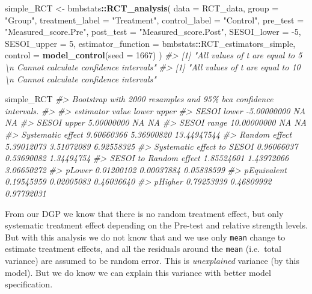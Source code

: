 \documentclass[
]{book}
\newenvironment{Shaded}{\begin{snugshade}}{\end{snugshade}}
\newcommand{\CommentTok}[1]{\textcolor[rgb]{0.56,0.35,0.01}{\textit{#1}}}
\newcommand{\DataTypeTok}[1]{\textcolor[rgb]{0.13,0.29,0.53}{#1}}
\newcommand{\DecValTok}[1]{\textcolor[rgb]{0.00,0.00,0.81}{#1}}
\newcommand{\KeywordTok}[1]{\textcolor[rgb]{0.13,0.29,0.53}{\textbf{#1}}}
\newcommand{\NormalTok}[1]{#1}
\newcommand{\OperatorTok}[1]{\textcolor[rgb]{0.81,0.36,0.00}{\textbf{#1}}}
\newcommand{\StringTok}[1]{\textcolor[rgb]{0.31,0.60,0.02}{#1}}
\begin{document}
\begin{Shaded}
\begin{Highlighting}[]
\NormalTok{simple\_RCT <{-}}\StringTok{ }\NormalTok{bmbstats}\OperatorTok{::}\KeywordTok{RCT\_analysis}\NormalTok{(}
  \DataTypeTok{data =}\NormalTok{ RCT\_data,}
  \DataTypeTok{group =} \StringTok{"Group"}\NormalTok{,}
  \DataTypeTok{treatment\_label =} \StringTok{"Treatment"}\NormalTok{,}
  \DataTypeTok{control\_label =} \StringTok{"Control"}\NormalTok{,}
  \DataTypeTok{pre\_test =} \StringTok{"Measured\_score.Pre"}\NormalTok{,}
  \DataTypeTok{post\_test =} \StringTok{"Measured\_score.Post"}\NormalTok{,}
  \DataTypeTok{SESOI\_lower =} \DecValTok{{-}5}\NormalTok{,}
  \DataTypeTok{SESOI\_upper =} \DecValTok{5}\NormalTok{,}
  \DataTypeTok{estimator\_function =}\NormalTok{ bmbstats}\OperatorTok{::}\NormalTok{RCT\_estimators\_simple,}
  \DataTypeTok{control =} \KeywordTok{model\_control}\NormalTok{(}\DataTypeTok{seed =} \DecValTok{1667}\NormalTok{)}
\NormalTok{)}
\CommentTok{\#> [1] "All values of t are equal to  5 \textbackslash{}n Cannot calculate confidence intervals"}
\CommentTok{\#> [1] "All values of t are equal to  10 \textbackslash{}n Cannot calculate confidence intervals"}


\NormalTok{simple\_RCT}
\CommentTok{\#> Bootstrap with 2000 resamples and 95\% bca confidence intervals.}
\CommentTok{\#> }
\CommentTok{\#>                   estimator       value      lower       upper}
\CommentTok{\#>                 SESOI lower {-}5.00000000         NA          NA}
\CommentTok{\#>                 SESOI upper  5.00000000         NA          NA}
\CommentTok{\#>                 SESOI range 10.00000000         NA          NA}
\CommentTok{\#>           Systematic effect  9.60660366 5.36900820 13.44947544}
\CommentTok{\#>               Random effect  5.39012073 3.51072089  6.92558325}
\CommentTok{\#>  Systematic effect to SESOI  0.96066037 0.53690082  1.34494754}
\CommentTok{\#>      SESOI to Random effect  1.85524601 1.43972066  3.06650272}
\CommentTok{\#>                      pLower  0.01200102 0.00037884  0.05838599}
\CommentTok{\#>                 pEquivalent  0.19545959 0.02005083  0.46036640}
\CommentTok{\#>                     pHigher  0.79253939 0.46809992  0.97792031}
\end{Highlighting}
\end{Shaded}

From our DGP we know that there is no random treatment effect, but only systematic treatment effect depending on the Pre-test and relative strength levels. But with this analysis we do not know that and we use only \texttt{mean} change to estimate treatment effects, and all the residuals around the \texttt{mean} (i.e.~total variance) are assumed to be random error. This is \emph{unexplained} variance (by this model). But we do know we can explain this variance with better model specification.
\end{document}
